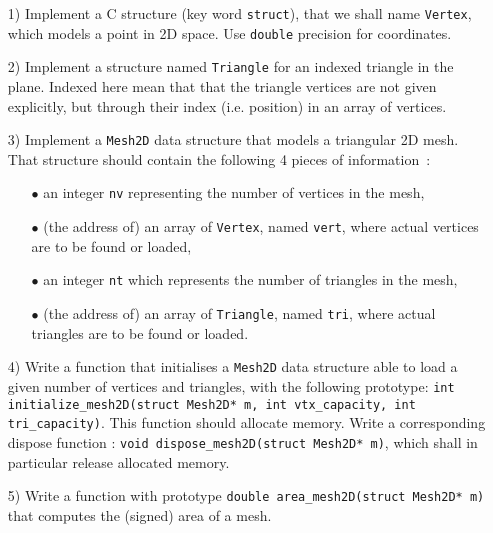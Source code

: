 \documentclass[a4paper,12pt]{article}
\begin{document}
\begin{itemize}

\item[1)] Implement a C structure (key word \texttt{struct}),
  that we shall name \texttt{Vertex}, which models a point in 2D space. Use {\tt double} precision 
  for coordinates.\\[-5pt]

\item[2)] Implement a structure named \texttt{Triangle} for an indexed triangle in the plane. Indexed here mean that   that the triangle vertices are not given explicitly, but through their index (i.e. position) in an array of vertices.\\[-5pt]

\item[3)] Implement a \texttt{Mesh2D} data structure that models a triangular 2D mesh. That structure should contain the following 4 pieces of information~:
  \begin{itemize}
  \item[$\bullet$] an integer \texttt{nv} representing the number of vertices in the mesh,
  \item[$\bullet$] (the address of) an array of {\tt Vertex}, named \texttt{vert}, where actual vertices are to be found or loaded,
  \item[$\bullet$] an integer \texttt{nt} which represents the number of triangles in the mesh,
  \item[$\bullet$] (the address of) an array of \texttt{Triangle}, named \texttt{tri}, where actual triangles are to be found or loaded.\\[-5pt]
  \end{itemize}

\item[4)] Write a function that initialises a {\tt Mesh2D} data structure able to load a given number of vertices and triangles, with the following prototype: \texttt{int initialize\_mesh2D(struct Mesh2D* m, int vtx\_capacity, int tri\_capacity)}. This function should allocate memory. Write a corresponding dispose function : \texttt{void dispose\_mesh2D(struct Mesh2D* m)}, which shall in particular release allocated memory.\\[-5pt]

\item[5)] Write a function with prototype \texttt{double area\_mesh2D(struct Mesh2D* m)} that computes the (signed) area of a mesh.


\end{itemize}
\end{document}
